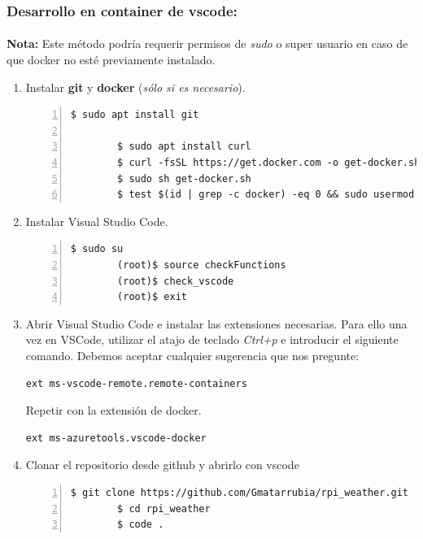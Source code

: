 \subsubsection{Desarrollo en container de \Gls{vscode}:}

\paragraph{}\textbf{Nota:} Este método podría requerir permisos de \emph{sudo} o super
usuario en caso de que docker no esté previamente instalado.

\begin{enumerate}
    \item Instalar \textbf{\gls{git}} y \textbf{docker} (\emph{sólo si es necesario}).
    \begin{lstlisting}[style=consola, numbers=left]
        $ sudo apt install git

        $ sudo apt install curl
        $ curl -fsSL https://get.docker.com -o get-docker.sh
        $ sudo sh get-docker.sh
        $ test $(id | grep -c docker) -eq 0 && sudo usermod -aG docker $(whoami)
    \end{lstlisting}

    \item Instalar Visual Studio Code.
    \begin{lstlisting}[style=consola, numbers=left]
        $ sudo su
        (root)$ source checkFunctions
        (root)$ check_vscode
        (root)$ exit
    \end{lstlisting}

    \item Abrir Visual Studio Code e instalar las extensiones necesarias. Para ello
    una vez en VSCode, utilizar el atajo de teclado \emph{Ctrl+p} e introducir el siguiente
    comando. Debemos aceptar cualquier sugerencia que nos pregunte:
    \begin{lstlisting}[style=cmd]
        ext ms-vscode-remote.remote-containers
    \end{lstlisting}
    Repetir con la extensión de docker.
    \begin{lstlisting}[style=cmd]
        ext ms-azuretools.vscode-docker
    \end{lstlisting}

    \item Clonar el repositorio desde github y abrirlo con \gls{vscode}
    \begin{lstlisting}[style=consola, numbers=left]
        $ git clone https://github.com/Gmatarrubia/rpi_weather.git
        $ cd rpi_weather
        $ code .
    \end{lstlisting}


\end{enumerate}
